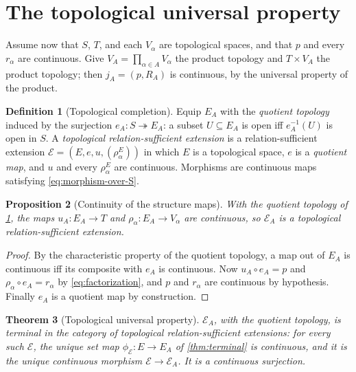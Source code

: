 \documentclass[11pt,reqno]{amsart}
\theoremstyle{plain}
\newtheorem{theorem}{Theorem}[section]
\newtheorem{proposition}[theorem]{Proposition}
\theoremstyle{definition}
\newtheorem{definition}[theorem]{Definition}
\theoremstyle{remark}
\numberwithin{equation}{section}
\begin{document}
\section{The topological universal property}
\label{sec:topology}

Assume now that $S$, $T$, and each $V_\alpha$ are topological spaces, and that $p$ and every
$r_\alpha$ are continuous. Give $V_A=\prod_{\alpha\in A}V_\alpha$ the product topology and
$T\times V_A$ the product topology; then $j_A=(p,R_A)$ is continuous, by the universal property of
the product.

\begin{definition}[Topological completion]
\label{def:top-EA}
Equip $E_A$ with the \emph{quotient topology} induced by the surjection
$e_A\colon S\twoheadrightarrow E_A$: a subset $U\subseteq E_A$ is open iff $e_A^{-1}(U)$ is open in
$S$. A \emph{topological relation-sufficient extension} is a relation-sufficient extension
$\mathcal E=(E,e,u,(\rho_\alpha^E))$ in which $E$ is a topological space, $e$ is a \emph{quotient
map}, and $u$ and every $\rho_\alpha^E$ are continuous. Morphisms are continuous maps satisfying
\eqref{eq:morphism-over-S}.
\end{definition}

\begin{proposition}[Continuity of the structure maps]
\label{prop:top-structure}
With the quotient topology of \cref{def:top-EA}, the maps $u_A\colon E_A\to T$ and
$\rho_\alpha\colon E_A\to V_\alpha$ are continuous, so $\mathcal E_A$ is a topological
relation-sufficient extension.
\end{proposition}

\begin{proof}
By the characteristic property of the quotient topology, a map out of $E_A$ is continuous iff its
composite with $e_A$ is continuous. Now $u_A\circ e_A=p$ and $\rho_\alpha\circ e_A=r_\alpha$ by
\eqref{eq:factorization}, and $p$ and $r_\alpha$ are continuous by hypothesis. Finally $e_A$ is a
quotient map by construction.
\end{proof}

\begin{theorem}[Topological universal property]
\label{thm:top-terminal}
$\mathcal E_A$, with the quotient topology, is terminal in the category of topological
relation-sufficient extensions: for every such $\mathcal E$, the unique set map
$\phi_{\mathcal E}\colon E\to E_A$ of \cref{thm:terminal} is continuous, and it is the unique
continuous morphism $\mathcal E\to\mathcal E_A$. It is a continuous surjection.
\end{theorem}
\end{document}
